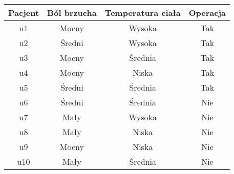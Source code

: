 \documentclass[11pt]{article}
\begin{document}
\begin{table}[h]
\centering
\begin{tabular}{c|c c c}
\hline
\hline
Pacjent&Ból brzucha&Temperatura ciała&Operacja\\
\hline
u1&Mocny&Wysoka&Tak\\
u2&Średni&Wysoka&Tak\\
u3&Mocny&Średnia&Tak\\
u4&Mocny&Niska&Tak\\
u5&Średni&Średnia&Tak\\
u6&Średni&Średnia&Nie\\
u7&Mały&Wysoka&Nie\\
u8&Mały&Niska&Nie\\
u9&Mocny&Niska&Nie\\
u10&Mały&Średnia&Nie\\
\hline
\hline
\end{tabular}
\end{table}
\newpage
\end{document}
